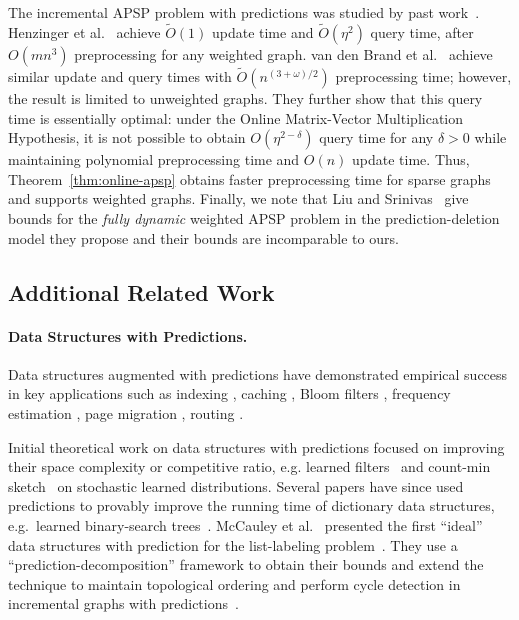 \documentclass[11pt]{article}
\begin{document}
The incremental APSP problem with predictions was studied by past work~\cite{HenzingerSSY24,BrandFNP24}.  Henzinger et al.~\cite{HenzingerSSY24} achieve $\tilde{O}(1)$ update time and $\tilde{O}(\eta^2)$ query time, after $O(mn^3)$ preprocessing for any weighted graph.
van den Brand et al.~\cite{BrandFNP24} achieve similar update and query times with $\tilde{O}(n^{(3 + \omega)/2})$ preprocessing time; however, the result is limited to unweighted graphs.  
They further show that this query time is essentially optimal: under the Online Matrix-Vector Multiplication Hypothesis, it is not possible to obtain $O(\eta^{2-\delta})$ query time for any $\delta > 0$ while maintaining polynomial preprocessing time and $O(n)$ update time.
Thus, Theorem~\ref{thm:online-apsp} obtains faster preprocessing time for sparse graphs and supports weighted graphs.  Finally, we note that Liu and Srinivas~\cite{liu2023predicted} give bounds for the \emph{fully dynamic} weighted APSP problem in the prediction-deletion model they propose and their bounds are incomparable to ours. \subsection{Additional Related Work}\label{sec:related}

\paragraph{Data Structures with Predictions.}

Data structures augmented with predictions have demonstrated empirical success in key applications such as indexing \cite{KraskaBCDP18,ding2020alex,DaiXGA20}, caching \cite{JiangP020,LykourisVassilvitskii21}, 
Bloom filters \cite{mitzenmacher2018model,vaidya2020partitioned}, frequency estimation \cite{hsu2019learning}, page migration \cite{IndykMMR22}, routing \cite{BhaskaraGKM20}.  

Initial theoretical work on data structures with predictions focused on improving their space complexity or competitive ratio, e.g. learned filters~\cite{vaidya2020partitioned,mitzenmacher2018model,bercea2022daisy} and count-min sketch~\cite{hsu2019learning,du2021putting} on stochastic learned distributions.  Several papers have since used predictions to provably improve the running time of dictionary data structures, e.g.\ learned binary-search trees~\cite{lin2022learning, chen2022power, zeynalirobust,dinitz2024binary}.  McCauley et al.~\cite{McCauleyMNS23} presented the first ``ideal'' data structures with prediction for the list-labeling problem~\cite{McCauleyMNS23}. They use a ``prediction-decomposition'' framework to obtain their bounds and extend the technique to maintain topological ordering and perform cycle detection in incremental graphs with predictions~\cite{McCauleyMoNi24}.
\end{document}

